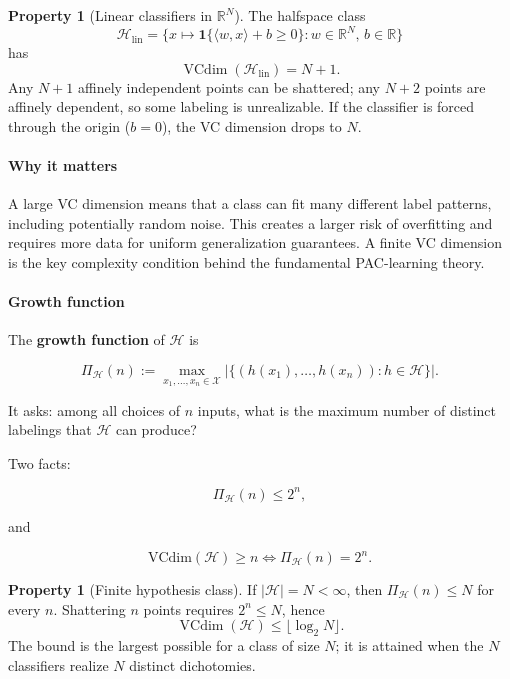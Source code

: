 \documentclass[11pt,a4paper]{article}
\DeclareMathOperator{\VCdim}{VCdim}
\theoremstyle{definition}
\newtheorem{property}[definition]{Property}
\begin{document}
\begin{property}[Linear classifiers in $\mathbb{R}^N$]
\label{prop:vc-linear}
The halfspace class
\[
\mathcal{H}_{\mathrm{lin}}
=
\bigl\{
x\mapsto\mathbf{1}\{\langle w,x\rangle+b\ge 0\}
:
w\in\mathbb{R}^N,\, b\in\mathbb{R}
\bigr\}
\]
has
\[
\VCdim(\mathcal{H}_{\mathrm{lin}})=N+1.
\]
Any $N+1$ affinely independent points can be shattered; any $N+2$ points are affinely dependent, so some labeling is unrealizable. If the classifier is forced through the origin ($b=0$), the VC dimension drops to $N$.
\end{property}

\paragraph{Why it matters}

A large VC dimension means that a class can fit many different label patterns, including potentially random noise. This creates a larger risk of overfitting and requires more data for uniform generalization guarantees. A finite VC dimension is the key complexity condition behind the fundamental PAC-learning theory.



\paragraph{Growth function}

The \textbf{growth function} of $\mathcal{H}$ is

\[
\Pi_{\mathcal{H}}(n) := \max_{x_1, \dots, x_n \in \mathcal{X}} |\{(h(x_1), \dots, h(x_n)) : h \in \mathcal{H}\}|.
\]

It asks: among all choices of $n$ inputs, what is the maximum number of distinct labelings that $\mathcal{H}$ can produce?

Two facts:

\[
\Pi_{\mathcal{H}}(n) \leq 2^n,
\]

and

\[
\text{VCdim}(\mathcal{H}) \geq n \iff \Pi_{\mathcal{H}}(n) = 2^n.
\]

\begin{property}[Finite hypothesis class]
\label{prop:vc-finite}
If $\lvert\mathcal{H}\rvert=N<\infty$, then $\Pi_{\mathcal{H}}(n)\le N$ for every $n$. Shattering $n$ points requires $2^n\le N$, hence
\[
\VCdim(\mathcal{H})\le\lfloor\log_2 N\rfloor.
\]
The bound is the largest possible for a class of size $N$; it is attained when the $N$ classifiers realize $N$ distinct dichotomies.
\end{property}
\end{document}
